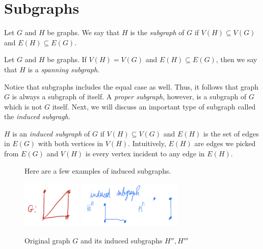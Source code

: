 \section{Subgraphs}

\begin{definition}[Subgraph]
  Let \(G\) and \(H\) be graphs. We say that \(H\) is the \textit{subgraph} of
  \(G\) if \(V(H) \subseteq V(G)\) and \(E(H) \subseteq E(G)\).
\end{definition}

\begin{definition}
  Let \(G\) and \(H\) be graphs. If \(V(H) = V(G)\) and \(E(H) \subseteq E(G)\), then we say that \(H\) is a \textit{spanning subgraph}.
\end{definition}

Notice that subgraphs includes the equal case as well. Thus, it follows that graph \(G\) is always a subgraph of itself. A \textit{proper subgraph},
however, is a subgraph of \(G\) which is not \(G\) itself. Next, we will discuss
an important type of
subgraph called the \textit{induced subgragh}.

\begin{definition}
  \(H\) is an \textit{induced subgraph} of \(G\) if \(V(H) \subseteq V(G)\) and \(E(H)\)
  is the set of edges in \(E(G)\) with both vertices in \(V(H)\). 
  Intuitively, \(E(H)\) are edges we picked from \(E(G)\) and \(V(H)\) is every
  vertex incident to any edge in \(E(H)\).
\end{definition}

\begin{figure}[ht]
\begin{nexample}
  Here are a few examples of induced subgraphs.

  \begin{center}
    \includegraphics[width=0.25\textwidth]{figures/l01/induced-original}
    \includegraphics[width=0.45\textwidth]{figures/l01/induced-subgraph}
    \caption{Original graph \(G\) and its induced subgraphs \(H'', H'''\)}\label{fig:induced-subgraph}
  \end{center}
\end{nexample}
\end{figure}

